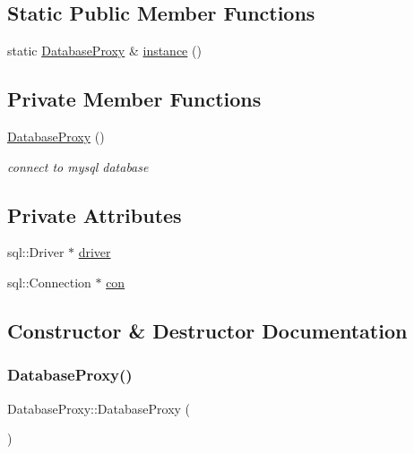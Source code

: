 \subsection*{Static Public Member Functions}
\begin{DoxyCompactItemize}
\item 
static \mbox{\hyperlink{class_database_proxy}{Database\+Proxy}} \& \mbox{\hyperlink{class_database_proxy_ae1502f646375bb6519c715dbe5535a43}{instance}} ()
\end{DoxyCompactItemize}
\subsection*{Private Member Functions}
\begin{DoxyCompactItemize}
\item 
\mbox{\hyperlink{class_database_proxy_ab56f53bf7448f765605c548a60a7cb69}{Database\+Proxy}} ()
\begin{DoxyCompactList}\small\item\em connect to mysql database \end{DoxyCompactList}\end{DoxyCompactItemize}
\subsection*{Private Attributes}
\begin{DoxyCompactItemize}
\item 
sql\+::\+Driver $\ast$ \mbox{\hyperlink{class_database_proxy_ac939a4eb877368773792ef0f79538faf}{driver}}
\item 
sql\+::\+Connection $\ast$ \mbox{\hyperlink{class_database_proxy_acb075c3ad08b6da866b931c39c8e8285}{con}}
\end{DoxyCompactItemize}


\subsection{Constructor \& Destructor Documentation}
\mbox{\label{class_database_proxy_ab56f53bf7448f765605c548a60a7cb69}} 
\subsubsection{\texorpdfstring{Database\+Proxy()}{DatabaseProxy()}}
{\footnotesize\ttfamily Database\+Proxy\+::\+Database\+Proxy (\begin{DoxyParamCaption}{ }\end{DoxyParamCaption})\hspace{0.3cm}{\ttfamily [private]}}



